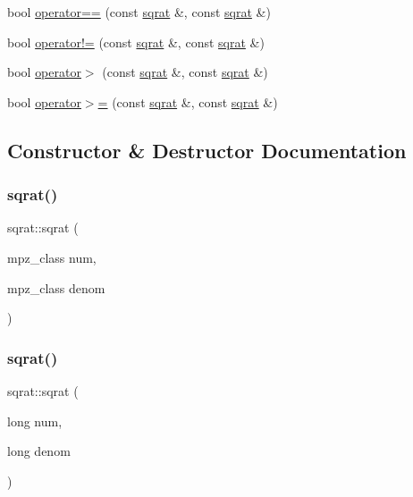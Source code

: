 \begin{DoxyCompactItemize}
\item 
bool \mbox{\hyperlink{classsqrat_aa31a4a7298644b244db89e455265c946}{operator==}} (const \mbox{\hyperlink{classsqrat}{sqrat}} \&, const \mbox{\hyperlink{classsqrat}{sqrat}} \&)
\item 
bool \mbox{\hyperlink{classsqrat_ae100dba56606c0cfbbe45c04ae9f462a}{operator!=}} (const \mbox{\hyperlink{classsqrat}{sqrat}} \&, const \mbox{\hyperlink{classsqrat}{sqrat}} \&)
\item 
bool \mbox{\hyperlink{classsqrat_a0a9ebc0afb8356e073d69a69d1450a65}{operator$>$}} (const \mbox{\hyperlink{classsqrat}{sqrat}} \&, const \mbox{\hyperlink{classsqrat}{sqrat}} \&)
\item 
bool \mbox{\hyperlink{classsqrat_adac0450048dc40c698aa22f334e280a1}{operator$>$=}} (const \mbox{\hyperlink{classsqrat}{sqrat}} \&, const \mbox{\hyperlink{classsqrat}{sqrat}} \&)
\end{DoxyCompactItemize}


\subsection{Constructor \& Destructor Documentation}
\mbox{\label{classsqrat_a7c588af79fec6e3765efdd7475418a6a}} 
\subsubsection{\texorpdfstring{sqrat()}{sqrat()}\hspace{0.1cm}{\footnotesize\ttfamily [1/15]}}
{\footnotesize\ttfamily sqrat\+::sqrat (\begin{DoxyParamCaption}\item[{mpz\+\_\+class}]{num,  }\item[{mpz\+\_\+class}]{denom }\end{DoxyParamCaption})}

\mbox{\label{classsqrat_a37c42a6db5d602e438935e2a8396b960}} 
\subsubsection{\texorpdfstring{sqrat()}{sqrat()}\hspace{0.1cm}{\footnotesize\ttfamily [2/15]}}
{\footnotesize\ttfamily sqrat\+::sqrat (\begin{DoxyParamCaption}\item[{long}]{num,  }\item[{long}]{denom }\end{DoxyParamCaption})}


